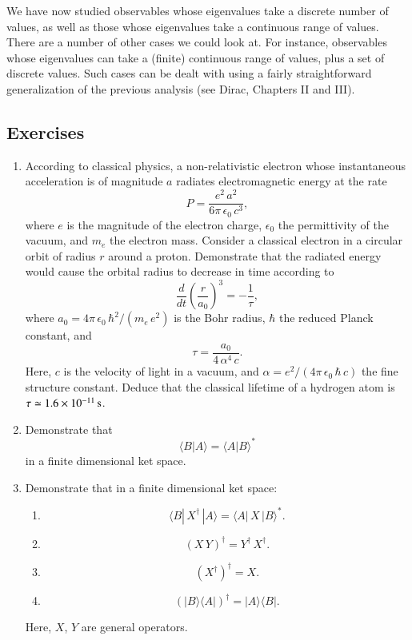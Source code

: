 We have now studied observables whose eigenvalues  take a discrete number of
values, as well as those whose eigenvalues  take a continuous range of values. There are 
a number of other cases
we could look at. For instance, observables whose eigenvalues can   take  a
(finite) continuous range of values, plus a set of discrete values. Such cases can be 
dealt with  using a fairly straightforward generalization of the previous
analysis (see Dirac, Chapters II and III).

\subsection*{Exercises}
\begin{enumerate}[label=\thechapter.\arabic*,leftmargin=*,widest=9.20]
\item According to classical physics, a non-relativistic electron whose instantaneous acceleration is of magnitude $a$ radiates 
electromagnetic energy at the rate
$$
P = \frac{e^2\,a^2}{6\pi\,\epsilon_0\,c^3},
$$
where $e$ is the magnitude of the electron charge, $\epsilon_0$ the permittivity of the vacuum, and $m_e$ the
electron mass. Consider a classical electron in a
circular orbit of radius $r$ around a proton. Demonstrate that the radiated energy  would cause the orbital radius to decrease in time according to 
$$
\frac{d}{dt}\left(\frac{r}{a_0}\right)^3 =- \frac{1}{\tau},
$$
where $a_0=4\pi\,\epsilon_0\,\hbar^2/(m_e\,e^2)$ is the Bohr radius, $\hbar$ the reduced Planck constant, and
$$
\tau=\frac{a_0}{4\,\alpha^4\,c}.
$$
Here, $c$ is the velocity of light in a vacuum, and $\alpha=e^2/(4\pi\,\epsilon_0\,\hbar\,c)$ the fine structure constant. 
Deduce that the classical lifetime of a hydrogen atom is $\tau\simeq 1.6\times 10^{-11}\,{\rm s}$. 

\item Demonstrate that 
$$
\langle B|A \rangle = \langle A|B \rangle^\ast
$$
in a finite dimensional ket space. 

\item Demonstrate that in a finite dimensional ket space:
\begin{enumerate}
\item
$$
\langle B|\,X^{\dag}\,|A\rangle = \langle A|\,X\, |B\rangle^\ast.
$$
\item
$$
(X\, Y)^{\dag} = Y^{\dag}\, X^{\dag}.
$$
\item
$$
(X^\dag)^\dag = X.
$$
\item
$$
(|B\rangle\langle A|)^\dag = |A\rangle\langle B|.
$$
\end{enumerate}
Here, $X$, $Y$ are general operators.


\end{enumerate}
